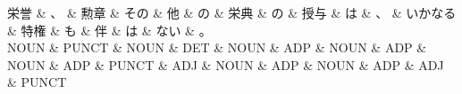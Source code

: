 \documentclass[tikz,border=5pt]{standalone}
\begin{document}
\normalsize
\begin{dependency}[edge unit distance=12.0pt]
    \begin{deptext}[column sep=1em]
        栄誉 \& 、 \& 勲章 \& その \& 他 \& の \& 栄典 \& の \& 授与 \& は \& 、 \& いかなる \& 特権 \& も \& 伴 \& は \& ない \& 。\\
        NOUN \& PUNCT \& NOUN \& DET \& NOUN \& ADP \& NOUN \& ADP \& NOUN \& ADP \& PUNCT \& ADJ \& NOUN \& ADP \& NOUN \& ADP \& ADJ \& PUNCT\\
    \end{deptext}
\end{dependency}
\end{document}
